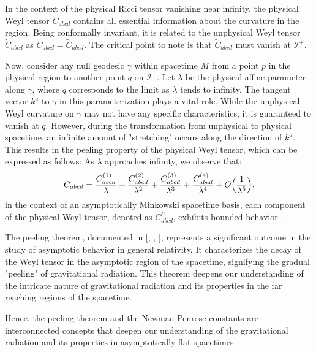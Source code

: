 In the context of the physical Ricci tensor vanishing near infinity, the physical Weyl tensor $C_{abcd}$ contains all essential information about the curvature in the region. Being conformally invariant, it is related to the unphysical Weyl tensor $\tilde{C}_{abcd}$ as $C_{abcd} = \tilde{C}_{abcd}$. The critical point to note is that $\tilde{C}_{abcd}$ must vanish at $\mathscr{I}^+$. 

Now, consider any null geodesic $\gamma$ within spacetime $M$ from a point $p$ in the physical region to another point $q$ on $\mathscr{I}^+$. Let $\lambda$ be the physical affine parameter along $\gamma$, where $q$ corresponds to the limit as $\lambda$ tends to infinity. The tangent vector $k^{a}$ to $\gamma$ in this parameterization plays a vital role. While the unphysical Weyl curvature on $\gamma$ may not have any specific characteristics, it is guaranteed to vanish at $q$. However, during the transformation from unphysical to physical spacetime, an infinite amount of "stretching" occurs along the direction of $k^{a}$. This results in the peeling property of the physical Weyl tensor, which can be expressed as follows: As $\lambda$ approaches infinity, we observe that:
\begin{equation}\label{eq:peeling}
  C_{a b c d}=\frac{C_{a b c d}^{(1)}}{\lambda}+\frac{C_{a b c d}^{(2)}}{\lambda^{2}}+\frac{C_{a b c d}^{(3)}}{\lambda^{3}}+\frac{C_{a b c d}^{(4)}}{\lambda^{4}}+O\Bigl(\frac{1}{\lambda^{5}}\Bigr),
\end{equation}
in the context of an asymptotically Minkowski spacetime basis, each component of the physical Weyl tensor, denoted as $C_{abcd}^{\mu}$, exhibits bounded behavior \cite{Wal84a}. 

The peeling theorem, documented in [\cite{Sac61}, \cite{BonBurMet62}, \cite{NewPen62}], represents a significant outcome in the study of asymptotic behavior in general relativity. It characterizes the decay of the Weyl tensor in the asymptotic region of
the spacetime, signifying the gradual "peeling" of gravitational radiation. This theorem deepens our understanding of the intricate nature of gravitational radiation and its properties in the far reaching regions of the spacetime.

Hence, the peeling theorem and the Newman-Penrose constants are interconnected concepts that deepen our
understanding of the gravitational radiation and its properties in asymptotically flat spacetimes.

